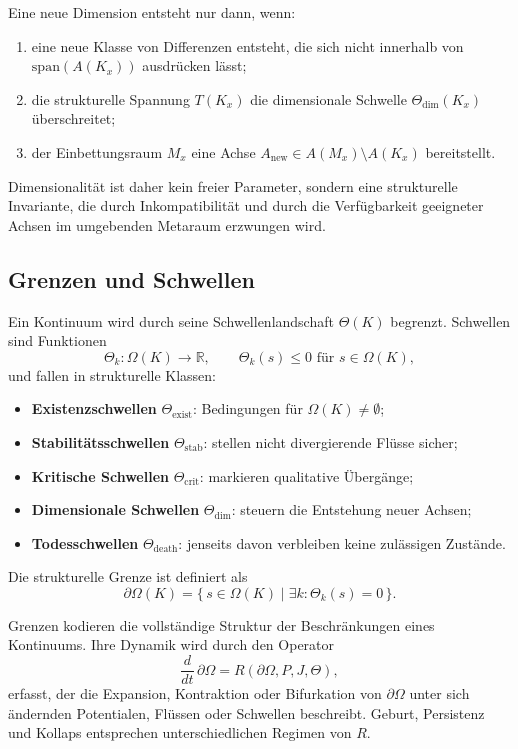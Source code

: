 Eine neue Dimension entsteht nur dann, wenn:

\begin{enumerate}
    \item eine neue Klasse von Differenzen entsteht, die sich nicht innerhalb von \(\mathrm{span}(A(K_x))\) ausdrücken lässt;
    \item die strukturelle Spannung \(T(K_x)\) die dimensionale Schwelle \(\Theta_{\mathrm{dim}}(K_x)\) überschreitet;
    \item der Einbettungsraum \(M_x\) eine Achse \(A_{\mathrm{new}}\in A(M_x)\setminus A(K_x)\) bereitstellt.
\end{enumerate}

Dimensionalität ist daher kein freier Parameter, sondern eine strukturelle Invariante, die durch Inkompatibilität und durch die Verfügbarkeit geeigneter Achsen im umgebenden Metaraum erzwungen wird.

\subsection{Grenzen und Schwellen}

Ein Kontinuum wird durch seine Schwellenlandschaft \(\Theta(K)\) begrenzt.  
Schwellen sind Funktionen
\[
\Theta_k : \Omega(K) \to \mathbb{R},
\qquad
\Theta_k(s)\le 0 \text{ für } s\in\Omega(K),
\]
und fallen in strukturelle Klassen:

\begin{itemize}
    \item \textbf{Existenzschwellen} \(\Theta_{\mathrm{exist}}\): Bedingungen für \(\Omega(K)\neq\emptyset\);
    \item \textbf{Stabilitätsschwellen} \(\Theta_{\mathrm{stab}}\): stellen nicht divergierende Flüsse sicher;
    \item \textbf{Kritische Schwellen} \(\Theta_{\mathrm{crit}}\): markieren qualitative Übergänge;
    \item \textbf{Dimensionale Schwellen} \(\Theta_{\mathrm{dim}}\): steuern die Entstehung neuer Achsen;
    \item \textbf{Todesschwellen} \(\Theta_{\mathrm{death}}\): jenseits davon verbleiben keine zulässigen Zustände.
\end{itemize}

Die strukturelle Grenze ist definiert als
\[
\partial\Omega(K) = \{\, s\in\Omega(K) \mid \exists k: \Theta_k(s)=0 \,\}.
\]

Grenzen kodieren die vollständige Struktur der Beschränkungen eines Kontinuums.  
Ihre Dynamik wird durch den Operator
\[
\frac{d}{dt}\,\partial\Omega = R(\partial\Omega, P, J, \Theta),
\]
erfasst, der die Expansion, Kontraktion oder Bifurkation von \(\partial\Omega\) unter sich ändernden Potentialen, Flüssen oder Schwellen beschreibt.  
Geburt, Persistenz und Kollaps entsprechen unterschiedlichen Regimen von \(R\).

